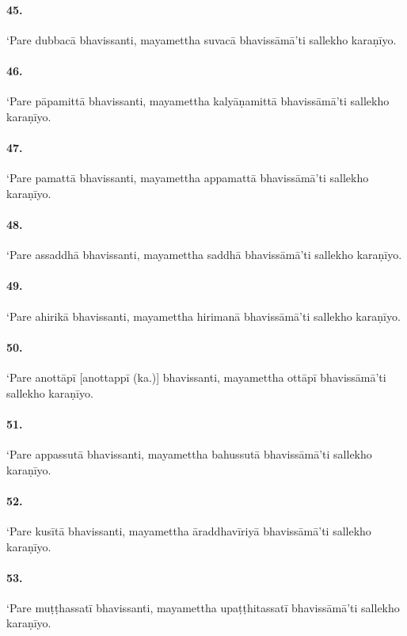 \paragraph{45.} ‘Pare dubbacā bhavissanti, mayamettha suvacā bhavissāmā’ti sallekho karaṇīyo.

\paragraph{46.} ‘Pare pāpamittā bhavissanti, mayamettha kalyāṇamittā bhavissāmā’ti sallekho karaṇīyo.

\paragraph{47.} ‘Pare pamattā bhavissanti, mayamettha appamattā bhavissāmā’ti sallekho karaṇīyo.

\paragraph{48.} ‘Pare assaddhā bhavissanti, mayamettha saddhā bhavissāmā’ti sallekho karaṇīyo.

\paragraph{49.} ‘Pare ahirikā bhavissanti, mayamettha hirimanā bhavissāmā’ti sallekho karaṇīyo.

\paragraph{50.} ‘Pare anottāpī [anottappī (ka.)] bhavissanti, mayamettha ottāpī bhavissāmā’ti sallekho karaṇīyo.

\paragraph{51.} ‘Pare appassutā bhavissanti, mayamettha bahussutā bhavissāmā’ti sallekho karaṇīyo.

\paragraph{52.} ‘Pare kusītā bhavissanti, mayamettha āraddhavīriyā bhavissāmā’ti sallekho karaṇīyo.

\paragraph{53.} ‘Pare muṭṭhassatī bhavissanti, mayamettha upaṭṭhitassatī bhavissāmā’ti sallekho karaṇīyo.

